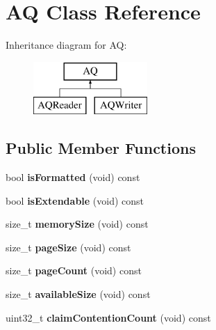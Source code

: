\hypertarget{class_a_q}{}\section{AQ Class Reference}
\label{class_a_q}
Inheritance diagram for AQ\+:\begin{figure}[H]
\begin{center}
\leavevmode
\includegraphics[height=2.000000cm]{class_a_q}
\end{center}
\end{figure}
\subsection*{Public Member Functions}
\begin{DoxyCompactItemize}
\item 
bool {\bfseries is\+Formatted} (void) const \hypertarget{class_a_q_a40ff86ec57b5e791b7e20c14e372999f}{}\label{class_a_q_a40ff86ec57b5e791b7e20c14e372999f}

\item 
bool {\bfseries is\+Extendable} (void) const \hypertarget{class_a_q_a7d869cae253ba0b35bd92cb38f647fda}{}\label{class_a_q_a7d869cae253ba0b35bd92cb38f647fda}

\item 
size\+\_\+t {\bfseries memory\+Size} (void) const \hypertarget{class_a_q_ae7442a5014d898f1f62f77737ce24feb}{}\label{class_a_q_ae7442a5014d898f1f62f77737ce24feb}

\item 
size\+\_\+t {\bfseries page\+Size} (void) const \hypertarget{class_a_q_ab47a5c88e8a23ec7a6e05f6d833c7d01}{}\label{class_a_q_ab47a5c88e8a23ec7a6e05f6d833c7d01}

\item 
size\+\_\+t {\bfseries page\+Count} (void) const \hypertarget{class_a_q_a0ee7e5627bf61ece4b47712d363aaeb9}{}\label{class_a_q_a0ee7e5627bf61ece4b47712d363aaeb9}

\item 
size\+\_\+t {\bfseries available\+Size} (void) const \hypertarget{class_a_q_a526b75b1f633fc6f96b6591ff47ef515}{}\label{class_a_q_a526b75b1f633fc6f96b6591ff47ef515}

\item 
uint32\+\_\+t {\bfseries claim\+Contention\+Count} (void) const \hypertarget{class_a_q_a83b0ae9501fdbc209a26868ff4c64ac3}{}\label{class_a_q_a83b0ae9501fdbc209a26868ff4c64ac3}

\end{DoxyCompactItemize}
